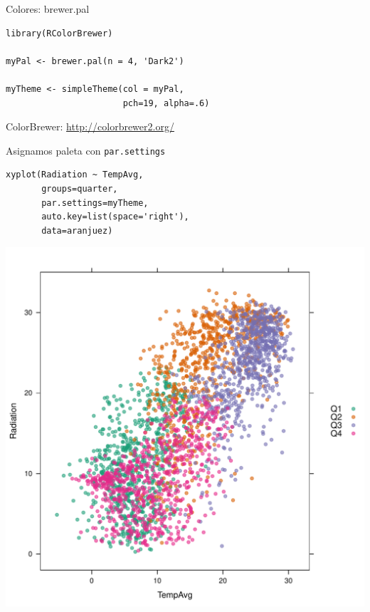 \documentclass[xcolor={usenames,svgnames,dvipsnames}]{beamer}
\begin{document}
\begin{frame}[fragile,label=sec-2-1-25]{Colores: brewer.pal}
 \lstset{language=R,label= ,caption= ,numbers=none}
\begin{lstlisting}
library(RColorBrewer)

myPal <- brewer.pal(n = 4, 'Dark2')

myTheme <- simpleTheme(col = myPal,
                       pch=19, alpha=.6)
\end{lstlisting}

\begin{block}{ColorBrewer: \url{http://colorbrewer2.org/}}
\end{block}
\end{frame}

\begin{frame}[fragile,label=sec-2-1-26]{Asignamos paleta con \texttt{par.settings}}
 \lstset{language=R,label= ,caption= ,numbers=none}
\begin{lstlisting}
xyplot(Radiation ~ TempAvg,
       groups=quarter,
       par.settings=myTheme,
       auto.key=list(space='right'),
       data=aranjuez)
\end{lstlisting}
\end{frame}

\begin{frame}[label=sec-2-1-27]{}
\includegraphics[width=.9\linewidth]{figs/brewer.pdf}
\end{frame}
\end{document}
